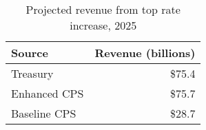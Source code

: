 \begin{table}[h]
    \centering
    \caption{Projected revenue from top rate increase, 2025}
    \label{tab:top_rate_reform}
    \begin{tabular}{lr}
    \toprule
    Source & Revenue (billions) \\
    \midrule
    Treasury & \$75.4 \\
    Enhanced CPS & \$75.7 \\
    Baseline CPS & \$28.7 \\
    \bottomrule
    \end{tabular}
\end{table}
